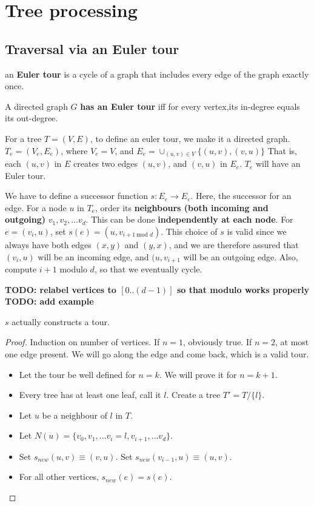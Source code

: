 \chapter{Tree processing}
\section{Traversal via an Euler tour}
\begin{definition}
an \textbf{Euler tour} is a cycle of a graph that includes every edge of the
graph exactly once.
\end{definition}

\begin{lemma}
A directed graph $G$ \textbf{has an Euler tour} iff for every vertex,its in-degree
equals its out-degree.
\end{lemma}

For a tree $T = (V, E)$, to define an euler tour, we make it a directed graph.
$T_e = (V_e, E_e)$, where $V_e = V$, and $E_e = \cup_{(u,v) \in V} \{ (u, v), (v, u) \}$
That is, each $(u, v)$ in $E$ creates two edges $(u, v)$, and $(v, u)$ in $E_e$.
$T_e$ will have an Euler tour.


We have to define a successor function $s: E_e \to E_e$. Here, the successor for an edge.
For a node $u$ in $T_e$, order its \textbf{neighbours (both incoming and outgoing)}
$v_1, v_2, \dots v_d$. This can be done \textbf{independently at each node}. 
For $e = (v_i, u)$, set $s(e) = (u, v_{i + 1~\text{mod $d$}})$. This choice of $s$ is valid
since we always have both edges $(x, y)$ and $(y, x)$, and we are therefore
assured that $(v_i, u)$ will be an incoming edge, and $(u, v_{i + 1}$ will be
an outgoing edge. Also, compute $i + 1$ modulo $d$, so that we eventually
cycle.

\textbf{TODO: relabel vertices to $[0..(d - 1)]$ so that modulo works properly}
\textbf{TODO: add example}

\begin{theorem}
$s$ actually constructs a tour.
\end{theorem}
\begin{proof}
Induction on number of vertices. If $n = 1$, obviously true. 
If $n = 2$, at most one edge present. We will go along the edge and come back,
which is a valid tour.


\begin{itemize}
\item Let the tour be well defined for $n = k$. We will prove it for $n = k + 1$.
\item Every tree has at least one leaf, call it $l$. Create a tree $T' = T/\{l\}$.
\item Let $u$ be a neighbour of $l$ in $T$.
\item Let $N(u) = \{ v_0, v_1, \dots v_i = l, v_{i + 1}, \dots v_d \}$.
\item Set $s_{new}(u, v) \equiv (v, u)$. Set $s_{new}(v_{i - 1}, u) \equiv (u, v)$.
\item For all other vertices, $s_{new}(e) = s(e)$.
\end{itemize}
\end{proof}


